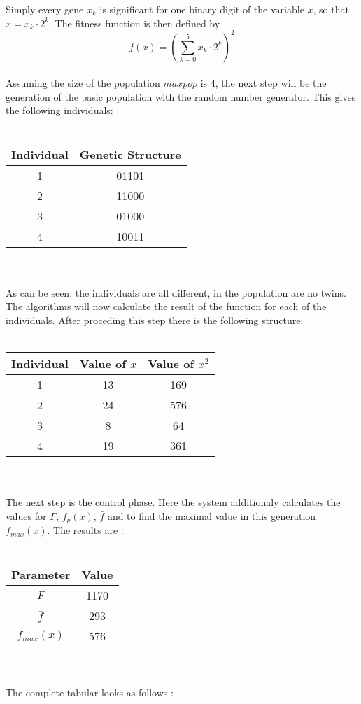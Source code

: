 Simply every gene $x_k$ is significant for one binary digit of the variable $x$, so
that $x = x_k \cdot 2^k$. The fitness function is then defined by
$$f(x) = (\sum_{k=0}^{5} x_k \cdot 2^k)^2$$
\\
Assuming the size of the population $maxpop$ is 4, the next step will be the
generation of the basic population with the random number generator. This gives
the following individuals:\\
\\
\begin{tabular}{c|c}
Individual & Genetic Structure\\ \hline
 1 & 01101\\
 2 & 11000\\
 3 & 01000\\
 4 & 10011\\
\end{tabular}
\\
\\
As can be seen, the individuals are all different, in the population are no
twins. The algorithms will now calculate the result of the function for each
of the individuals. After proceding this step there is the following structure:\\
\\
\begin{tabular}{c|c|c}
Individual & Value of $x$ & Value of $x^2$\\ \hline
 1 & 13 & 169\\
 2 & 24 & 576\\
 3 & 8 & 64 \\
 4 & 19 & 361\\
\end{tabular}
\\
\\
The next step is the control phase. Here the system additionaly calculates
the values for $F$, $f_p(x)$, $\bar{f}$ and to find the maximal value in this 
generation $f_{max}(x)$.
The results are :\\
\\
\begin{tabular}{c|c}
Parameter & Value \\ \hline
$F$ & 1170 \\
$\bar{f}$ & 293 \\
$f_{max}(x)$ & 576 \\
\end{tabular}
\\
\\
The complete tabular looks as follows :\\
